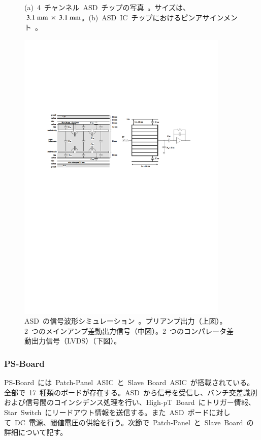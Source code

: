 \begin{figure}[H]
\begin{minipage}{0.49\hsize}
        \subcaption{}
        \end{minipage}
        \caption[ASD~チップの詳細]{(a)~4~チャンネル~ASD~チップの写真~\cite{URL:06}。サイズは、$~3.1~\rm{mm}~\times~3.1~\rm{mm}$。(b)~ASD~IC~チップにおけるピンアサインメント~\cite{URL:06}。}\label{fig:ASD}
\end{figure}

\begin{figure}[H]
        \centering   
        \includegraphics[width=0.9\textwidth,page=2]{img/pdf/ASD.pdf}
        \caption[ASD~の信号波形シミュレーション]{ASD~の信号波形シミュレーション~\cite{URL:06}。プリアンプ出力（上図）。2~つのメインアンプ差動出力信号（中図）。2~つのコンパレータ差動出力信号（LVDS）（下図）。}
        \label{fig:signal}
\end{figure}

\subsubsection{PS-Board}
PS-Board~には~Patch-Panel~ASIC~と~Slave~Board~ASIC~が搭載されている。全部で~17~種類のボードが存在する。ASD~から信号を受信し、バンチ交差識別および信号間のコインシデンス処理を行い、High-pT~Board~にトリガー情報、Star~Switch~にリードアウト情報を送信する。また~ASD~ボードに対して~DC~電源、閾値電圧の供給を行う。次節で~Patch-Panel~と~Slave~Board~の詳細について記す。

